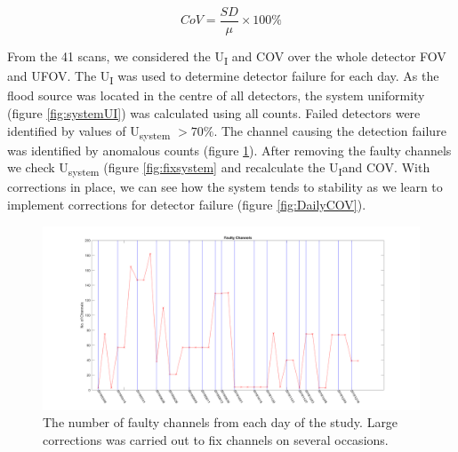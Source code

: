 \begin{equation} \label{eqn:CoV}
        CoV = \frac{SD}{\mu}\times100\%
\end{equation}

From the 41 scans, we considered the U\textsubscript{I} and \acrshort{COV} over the whole detector \acrshort{FOV} and \acrshort{UFOV}. The U\textsubscript{I} was used to determine detector failure for each day. As the flood source was located in the centre of all detectors, the system uniformity (figure \ref{fig:systemUI}) was calculated using all counts. Failed detectors were identified by values of  U\textsubscript{system} $> 70\%$. The channel causing the detection failure was identified by anomalous counts (figure \ref{fig:FaultyDay}). After removing the faulty channels we check U\textsubscript{system} (figure \ref{fig:fixsystem} and recalculate the U\textsubscript{I}and \acrshort{COV}. With corrections in place, we can see how the system tends to stability as we learn to implement corrections for detector failure (figure \ref{fig:DailyCOV}). 

\begin{figure}[!t]
\centering
\includegraphics[width=5.5in]{figures/FaultyChannels02.png}

    \caption{The number of faulty channels from each day of the study. Large corrections was carried out to fix channels on several occasions.} \label{fig:FaultyDay}
\end{figure}

